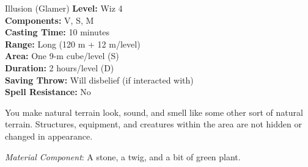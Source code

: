 {Illusion (Glamer)}
{
	\textbf{Level:}
	Wiz 4\\
	\textbf{Components:}
	V, S, M\\
	\textbf{Casting Time:}
	10 minutes\\
	\textbf{Range:}
	Long (120 m + 12 m/level)\\
	\textbf{Area:}
	One 9-m cube/level (S)\\
	\textbf{Duration:}
	2 hours/level (D)\\
	\textbf{Saving Throw:}
	Will disbelief (if interacted with)\\
	\textbf{Spell Resistance:}
	No\\
}
{
	You make natural terrain look, sound, and smell like some other sort of natural terrain. Structures, equipment, and creatures within the area are not hidden or changed in appearance.

	\textit{Material Component}:
	A stone, a twig, and a bit of green plant.

}
